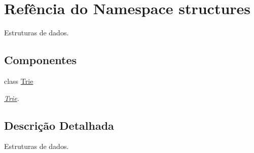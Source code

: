 \hypertarget{namespacestructures}{}\section{Refência do Namespace structures}
\label{namespacestructures}


Estruturas de dados.  


\subsection*{Componentes}
\begin{DoxyCompactItemize}
\item 
class \hyperlink{classstructures_1_1Trie}{Trie}
\begin{DoxyCompactList}\small\item\em \hyperlink{classstructures_1_1Trie}{Trie}. \end{DoxyCompactList}\end{DoxyCompactItemize}


\subsection{Descrição Detalhada}
Estruturas de dados. 